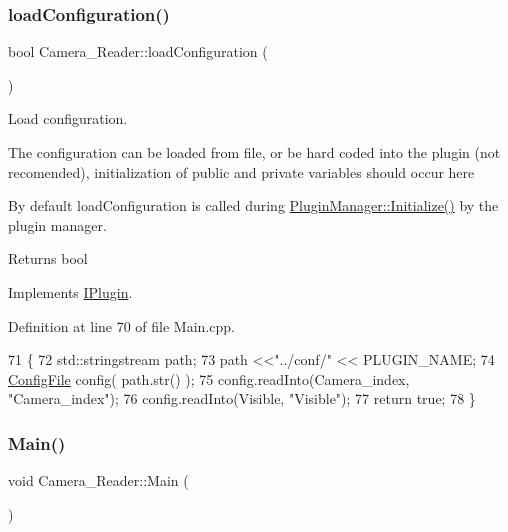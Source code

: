 \subsubsection{\texorpdfstring{load\+Configuration()}{loadConfiguration()}}
{\footnotesize\ttfamily bool Camera\+\_\+\+Reader\+::load\+Configuration (\begin{DoxyParamCaption}{ }\end{DoxyParamCaption})\hspace{0.3cm}{\ttfamily [virtual]}}



Load configuration. 

The configuration can be loaded from file, or be hard coded into the plugin (not recomended), initialization of public and private variables should occur here

By default load\+Configuration is called during \hyperlink{class_plugin_manager_a956e653b7db36da9d034b4a93c8308d5}{Plugin\+Manager\+::\+Initialize()} by the plugin manager.

\begin{DoxyReturn}{Returns}
bool 
\end{DoxyReturn}


Implements \hyperlink{class_i_plugin_a418cff309436d3a15d9a4ce7369db6dd}{I\+Plugin}.



Definition at line 70 of file Main.\+cpp.


\begin{DoxyCode}
71 \{
72     std::stringstream path;
73     path <<\textcolor{stringliteral}{"../conf/"} << PLUGIN\_NAME;
74     \hyperlink{class_config_file}{ConfigFile} config( path.str() );
75     config.readInto(Camera\_index, \textcolor{stringliteral}{"Camera\_index"});
76     config.readInto(Visible, \textcolor{stringliteral}{"Visible"});
77     \textcolor{keywordflow}{return} \textcolor{keyword}{true};
78 \}
\end{DoxyCode}
\mbox{\label{class_camera___reader_af3fabc94e27e6ce1702d26829126b9dc}} 
\subsubsection{\texorpdfstring{Main()}{Main()}}
{\footnotesize\ttfamily void Camera\+\_\+\+Reader\+::\+Main (\begin{DoxyParamCaption}{ }\end{DoxyParamCaption})\hspace{0.3cm}{\ttfamily [virtual]}}



